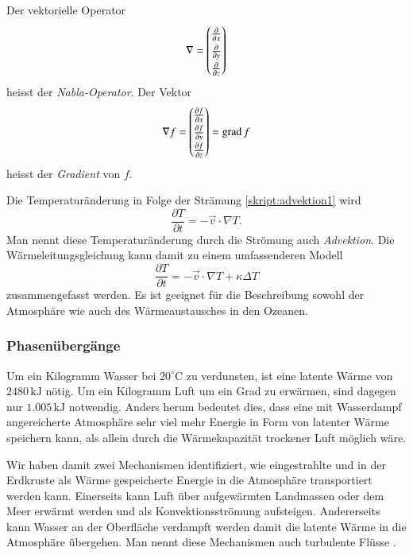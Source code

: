 \begin{definition}
Der vektorielle Operator 
\[
\nabla
=
\def\arraystretch{1.3}
\begin{pmatrix}
\frac{\partial}{\partial x}\\
\frac{\partial}{\partial y}\\
\frac{\partial}{\partial z}
\end{pmatrix}
\]
heisst der {\em Nabla-Operator}.
Der Vektor
\[
\nabla f
=
\def\arraystretch{1.3}
\begin{pmatrix}
\frac{\partial f}{\partial x}\\
\frac{\partial f}{\partial y}\\
\frac{\partial f}{\partial z}
\end{pmatrix}
=
\operatorname{grad} f
\]
heisst der {\em Gradient} von $f$.
\end{definition}
%
%

Die Temperaturänderung in Folge der Strämung 
\eqref{skript:advektion1}
wird 
\begin{equation}
\frac{\partial T}{\partial t}
=
-\vec{v}\cdot\nabla T.
\label{skript:advektion2}
\end{equation}
%
Man nennt diese Temperaturänderung durch die Strömung auch
{\em Advektion}.
Die Wärmeleitungsgleichung kann damit zu einem umfassenderen
Modell
\begin{equation}
\frac{\partial T}{\partial t}
=
-\vec{v}\cdot\nabla T +\kappa\Delta T
\label{skript:waermeleitungadvektion}
\end{equation}
zusammengefasst werden.
Es ist geeignet für die Beschreibung sowohl der Atmosphäre wie auch des
Wärmeaustausches in den Ozeanen.

\subsubsection{Phasenübergänge}
Um ein Kilogramm Wasser bei $20^\circ\text{C}$ zu verdunsten, ist eine
latente Wärme von $2480\,\text{kJ}$ nötig.
Um ein Kilogramm Luft um ein Grad zu erwärmen, sind dagegen nur
$1.005\,\text{kJ}$ notwendig.
Anders herum bedeutet dies, dass eine mit Wasserdampf angereicherte Atmosphäre
sehr viel mehr Energie in Form von latenter Wärme speichern kann, als
allein durch die Wärmekapazität trockener Luft möglich wäre.

Wir haben damit zwei Mechanismen identifiziert, wie eingestrahlte
und in der Erdkruste als Wärme gespeicherte Energie in die Atmosphäre 
transportiert werden kann.
Einerseits kann Luft über aufgewärmten Landmassen oder dem Meer erwärmt
werden und als Konvektionsströmung aufsteigen.
Andererseits kann Wasser an der Oberfläche verdampft werden damit die
latente Wärme in die Atmosphäre übergehen.
Man nennt diese Mechanismen auch turbulente Flüsse
\cite[S.~70]{skript:wiefunktioniertdas}.

